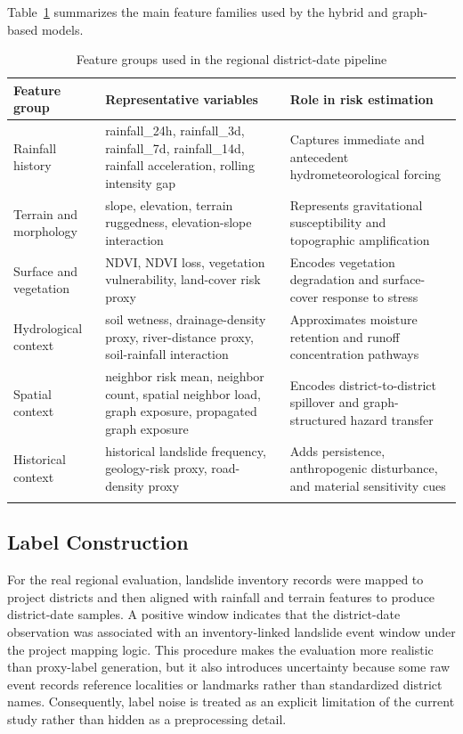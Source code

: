 \documentclass[pdflatex,sn-mathphys-num]{sn-jnl}
\begin{document}
Table~\ref{tab:feature_groups} summarizes the main feature families used by the hybrid and graph-based models.

\begin{table}[h]
\caption{Feature groups used in the regional district-date pipeline}
\label{tab:feature_groups}
\begin{tabular}{@{}p{3.0cm}p{4.9cm}p{5.0cm}@{}}
\toprule
Feature group & Representative variables & Role in risk estimation \\
\midrule
Rainfall history & rainfall\_24h, rainfall\_3d, rainfall\_7d, rainfall\_14d, rainfall acceleration, rolling intensity gap & Captures immediate and antecedent hydrometeorological forcing \\
Terrain and morphology & slope, elevation, terrain ruggedness, elevation-slope interaction & Represents gravitational susceptibility and topographic amplification \\
Surface and vegetation & NDVI, NDVI loss, vegetation vulnerability, land-cover risk proxy & Encodes vegetation degradation and surface-cover response to stress \\
Hydrological context & soil wetness, drainage-density proxy, river-distance proxy, soil-rainfall interaction & Approximates moisture retention and runoff concentration pathways \\
Spatial context & neighbor risk mean, neighbor count, spatial neighbor load, graph exposure, propagated graph exposure & Encodes district-to-district spillover and graph-structured hazard transfer \\
Historical context & historical landslide frequency, geology-risk proxy, road-density proxy & Adds persistence, anthropogenic disturbance, and material sensitivity cues \\
\botrule
\end{tabular}
\end{table}

\subsection{Label Construction}

For the real regional evaluation, landslide inventory records were mapped to project districts and then aligned with rainfall and terrain features to produce district-date samples. A positive window indicates that the district-date observation was associated with an inventory-linked landslide event window under the project mapping logic. This procedure makes the evaluation more realistic than proxy-label generation, but it also introduces uncertainty because some raw event records reference localities or landmarks rather than standardized district names. Consequently, label noise is treated as an explicit limitation of the current study rather than hidden as a preprocessing detail.
\end{document}
